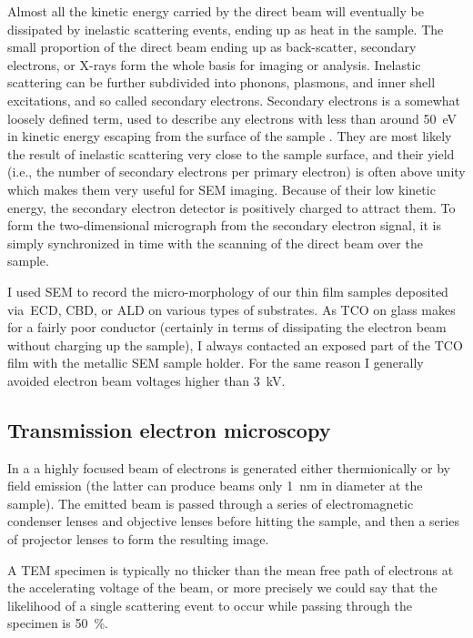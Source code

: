 \documentclass[draft,webedition,openright,titles,swedish,english]{LuaUUThesis}\usepackage[]{graphicx}\usepackage[]{xcolor}
\newcommand{\ie}{i.e.}
\newcommand{\via}{via}
\begin{document}
Almost all the kinetic energy carried by the direct beam will eventually be
dissipated by inelastic scattering events, ending up as heat in the sample.
The small proportion of the direct beam ending up as back-scatter, secondary
electrons, or X-rays form the whole basis for imaging or analysis.
%
Inelastic scattering can be further subdivided into phonons, plasmons,
and inner shell excitations, and so called secondary electrons.
Secondary electrons is a somewhat loosely defined term, used to describe any electrons with
less than around \qty{50}{\eV} in kinetic energy escaping from
the surface of the sample \cite{Goodhew2001}.
They are most likely the result of inelastic scattering
very close to the sample surface, and
their yield (\ie, the number of secondary electrons per primary electron)
is often above unity which makes them very useful for \gls{SEM} imaging.
Because of their low kinetic energy, the secondary electron detector is
positively charged to attract them.
To form the two-dimensional micrograph from the secondary electron signal, it is simply
synchronized in time with the scanning of the direct beam over the sample.

I used \gls{SEM} to record the micro-morphology of our thin film samples
deposited \via\ \gls{ECD}, \gls{CBD}, or \gls{ALD} on various types of
 substrates.
As \gls{TCO} on glass makes for a fairly poor conductor (certainly in terms of
dissipating the electron beam without charging up the sample), I always
contacted an exposed part of the \gls{TCO} film with the metallic \gls{SEM}
sample holder.
For the same reason I generally avoided electron beam voltages higher than \qty{3}{\kV}.



\subsection{Transmission electron microscopy}
\label{methods:transmission-electron-microscopy}

In a  a highly focused beam of electrons is generated either
thermionically or by field emission (the latter can produce beams only \qty{1}{\nm}
in diameter at the sample).
The emitted beam is passed through a series of electromagnetic condenser lenses
and objective lenses before hitting the sample, and then a series of projector lenses
to form the resulting image.

A \gls{TEM} specimen is typically no thicker than the mean free path of
electrons at the accelerating voltage of the beam, or more precisely
we could say that the likelihood of a single scattering event to occur while
passing through the specimen is \qty{50}{\percent}.
\end{document}
